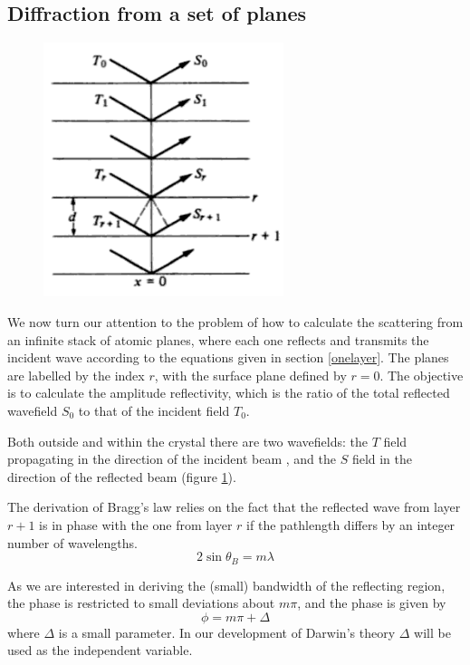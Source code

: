 \documentclass[12pt,oneside,notitlepage,abstracton,a4paper]{scrartcl}
\begin{document}
\subsection{Diffraction from a set of planes}
\begin{figure}
\vspace{-40pt}
\begin{center}
\includegraphics[width=7cm]{pics/picture3.png}
\caption{}
\label{pic3}
\end{center}
\end{figure}We now turn our attention to the problem of how to calculate the scattering from an infinite stack of atomic planes, where each one reflects and transmits the incident wave according to the equations given in section \ref{onelayer}. The planes are labelled by the index $r$, with the surface plane defined by $r=0$. The objective is to calculate the amplitude reflectivity, which is the ratio of the total reflected wavefield $S_0$ to that of the incident field $T_0$.

Both outside and within the crystal there are two wavefields: the $T$ field propagating in the direction of the incident beam , and the $S$ field in the direction of the reflected beam (figure \ref{pic3}).




The derivation of Bragg's law relies on the fact that the reflected wave from layer $r+1$ is in phase with the one from layer $r$ if the pathlength differs by an integer number of wavelengths. 
\begin{equation}\label{bragg}
 2\sin{\theta_B}=m\lambda
\end{equation}

As we are interested in deriving the (small) bandwidth of the reflecting region, the phase is restricted to small deviations about $m\pi$, and the phase is given by
\begin{equation}\label{phase}
 \phi=m\pi+\Delta
\end{equation}
where $\Delta$ is a small parameter. In our development of Darwin's theory $\Delta$ will be used as the independent variable.
\end{document}
